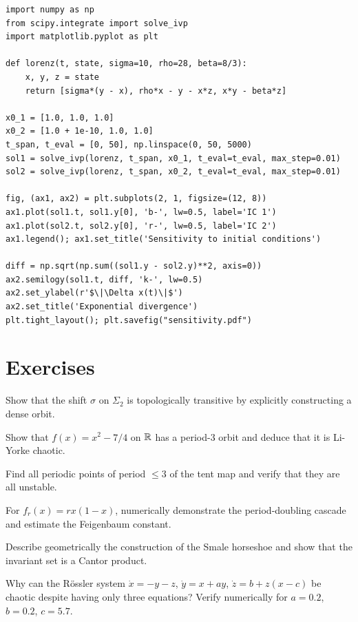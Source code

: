 \begin{codeblock}[title=\textbf{Demonstrating sensitivity to initial conditions}]
\begin{verbatim}
import numpy as np
from scipy.integrate import solve_ivp
import matplotlib.pyplot as plt

def lorenz(t, state, sigma=10, rho=28, beta=8/3):
    x, y, z = state
    return [sigma*(y - x), rho*x - y - x*z, x*y - beta*z]

x0_1 = [1.0, 1.0, 1.0]
x0_2 = [1.0 + 1e-10, 1.0, 1.0]
t_span, t_eval = [0, 50], np.linspace(0, 50, 5000)
sol1 = solve_ivp(lorenz, t_span, x0_1, t_eval=t_eval, max_step=0.01)
sol2 = solve_ivp(lorenz, t_span, x0_2, t_eval=t_eval, max_step=0.01)

fig, (ax1, ax2) = plt.subplots(2, 1, figsize=(12, 8))
ax1.plot(sol1.t, sol1.y[0], 'b-', lw=0.5, label='IC 1')
ax1.plot(sol2.t, sol2.y[0], 'r-', lw=0.5, label='IC 2')
ax1.legend(); ax1.set_title('Sensitivity to initial conditions')

diff = np.sqrt(np.sum((sol1.y - sol2.y)**2, axis=0))
ax2.semilogy(sol1.t, diff, 'k-', lw=0.5)
ax2.set_ylabel(r'$\|\Delta x(t)\|$')
ax2.set_title('Exponential divergence')
plt.tight_layout(); plt.savefig("sensitivity.pdf")
\end{verbatim}
\end{codeblock}

\section{Exercises}

\begin{exercise}
Show that the shift $\sigma$ on $\Sigma_2$ is topologically transitive by
explicitly constructing a dense orbit.
\end{exercise}

\begin{exercise}
Show that $f(x) = x^2 - 7/4$ on $\mathbb{R}$ has a period-3 orbit and deduce that it
is Li-Yorke chaotic.
\end{exercise}

\begin{exercise}
Find all periodic points of period $\leq 3$ of the tent map and verify that
they are all unstable.
\end{exercise}

\begin{exercise}
For $f_r(x) = rx(1-x)$, numerically demonstrate the period-doubling cascade
and estimate the Feigenbaum constant.
\end{exercise}

\begin{exercise}[Horseshoe]
Describe geometrically the construction of the Smale horseshoe and show that
the invariant set is a Cantor product.
\end{exercise}

\begin{exercise}
Why can the R\"ossler system $\dot{x} = -y - z$, $\dot{y} = x + ay$,
$\dot{z} = b + z(x - c)$ be chaotic despite having only three equations?
Verify numerically for $a = 0.2$, $b = 0.2$, $c = 5.7$.
\end{exercise}
